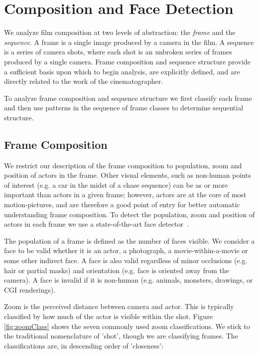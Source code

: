 \section*{Composition and Face Detection}

We analyze film composition at two levels of abstraction: the \emph{frame} and the \emph{sequence}.  A frame is a single image produced by a camera in the film.  A sequence is a series of camera shots, where each shot is an unbroken series of frames produced by a single camera.  Frame composition and sequence structure provide a sufficient basis upon which to begin analysis, are explicitly defined, and are directly related to the work of the cinematographer.

To analyze frame composition and sequence structure we first classify each frame and then use patterns in the sequence of frame classes to determine sequential structure.

\subsection*{Frame Composition}

We restrict our description of the frame composition to population, zoom and position of actors in the frame. Other visual elements, such as non-human points of interest (e.g. a car in the midst of a chase sequence) can be as or more important than actors in a given frame; however, actors are at the core of most motion-pictures, and are therefore a good point of entry for better automatic understanding frame composition. To detect the population, zoom and position of actors in each frame we use a state-of-the-art face detector~\cite{mathias_face_2014}.

The population of a frame is defined as the number of faces visible. We consider a face to be valid whether it is an actor, a photograph, a movie-within-a-movie or some other indirect face. A face is also valid regardless of minor occlusions (e.g. hair or partial masks) and orientation (e.g. face is oriented away from the camera). A face is invalid if it is non-human (e.g. animals, monsters, drawings, or CGI renderings). 

Zoom is the perceived distance between camera and actor. This is typically classified by how much of the actor is visible within the shot. Figure \ref{fig:zoomClass} shows the seven commonly used zoom classifications. We stick to the traditional nomenclature of 'shot', though we are classifying frames. The classifications  are, in descending order of 'closeness':



